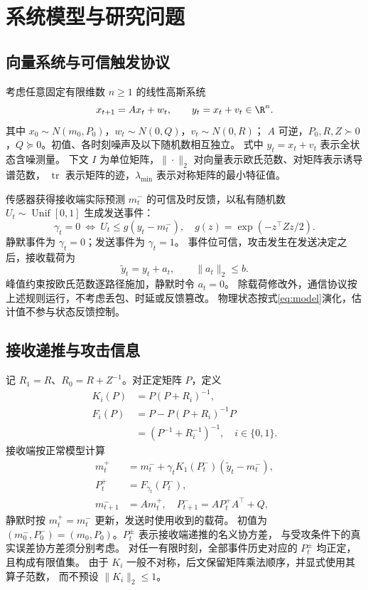 \section{系统模型与研究问题}
\label{sec:model}
\subsection{向量系统与可信触发协议}
考虑任意固定有限维数 $n\ge1$ 的线性高斯系统
\begin{equation}
 x_{t+1}=Ax_t+w_t,\qquad y_t=x_t+v_t\in\R^n.
 \label{eq:model}
\end{equation}
其中 $x_0\sim N(m_0,P_0)$，$w_t\sim N(0,Q)$，$v_t\sim N(0,R)$；
$A$ 可逆，$P_0,R,Z\succ0$，$Q\succeq0$。初值、各时刻噪声及以下随机数相互独立。
式中 $y_t=x_t+v_t$ 表示全状态含噪测量。
下文 $I$ 为单位矩阵，$\|\cdot\|_2$ 对向量表示欧氏范数、对矩阵表示诱导谱范数，
$\operatorname{tr}$ 表示矩阵的迹，$\lambda_{\min}$ 表示对称矩阵的最小特征值。

传感器获得接收端实际预测 $m_t^-$ 的可信及时反馈，以私有随机数
$U_t\sim\operatorname{Unif}[0,1]$ 生成发送事件：
\begin{equation}
 \gamma_t=0\ \Longleftrightarrow\ U_t\le g(y_t-m_t^-),\quad
 g(z)=\exp(-z^\top Zz/2).
 \label{eq:trigger}
\end{equation}
静默事件为 $\gamma_t=0$；发送事件为 $\gamma_t=1$。
事件位可信，攻击发生在发送决定之后，接收载荷为
\begin{equation}
 \widetilde y_t=y_t+a_t,\qquad \|a_t\|_2\le b.
 \label{eq:peak}
\end{equation}
峰值约束按欧氏范数逐路径施加，静默时令 $a_t=0$。
除载荷修改外，通信协议按上述规则运行，不考虑丢包、时延或反馈篡改。
物理状态按式\eqref{eq:model}演化，估计值不参与状态反馈控制。

\subsection{接收递推与攻击信息}
记 $R_1=R$、$R_0=R+Z^{-1}$。对正定矩阵 $P$，定义
\begin{equation}
 \begin{aligned}
 K_i(P)&=P(P+R_i)^{-1},\\
 F_i(P)&=P-P(P+R_i)^{-1}P\\
       &=(P^{-1}+R_i^{-1})^{-1},\quad i\in\{0,1\}.
 \end{aligned}
 \label{eq:gains}
\end{equation}
接收端按正常模型计算
\begin{equation}
 \begin{aligned}
 m_t^+&=m_t^-+\gamma_tK_1(P_t^-)(\widetilde y_t-m_t^-),\\
 P_t^+&=F_{\gamma_t}(P_t^-),\\
 m_{t+1}^-&=Am_t^+,\quad P_{t+1}^-=AP_t^+A^\top+Q,
 \end{aligned}
 \label{eq:receiver}
\end{equation}
静默时按 $m_t^+=m_t^-$ 更新，发送时使用收到的载荷。
初值为 $(m_0^-,P_0^-)=(m_0,P_0)$。$P_t^\pm$ 表示接收端递推的名义协方差，
与受攻条件下的真实误差协方差须分别考虑。
对任一有限时刻，全部事件历史对应的 $P_t^\pm$ 均正定，且构成有限值集。
由于 $K_i$ 一般不对称，后文保留矩阵乘法顺序，并显式使用其算子范数，
而不预设 $\|K_i\|_2\le1$。

